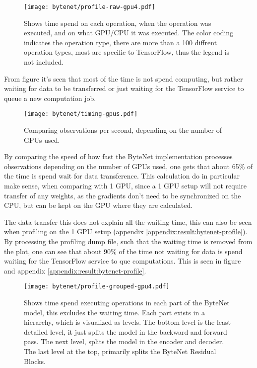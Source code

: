 \begin{figure}[h]
    \centering
    \texttt{[image: bytenet/profile-raw-gpu4.pdf]}
    \caption{Shows time spend on each operation, when the operation was executed, and on what GPU/CPU it was executed. The color coding indicates the operation type, there are more than a 100 diffrent operation types, most are specific to TensorFlow, thus the legend is not included.}
    \label{fig:result:bytenet:profile-raw}
\end{figure}

From figure \label{fig:result:bytenet:profile-raw} it's seen that most of the time is not spend computing, but rather waiting for data to be transferred or just waiting for the TensorFlow service to queue a new computation job.

\begin{figure}[h]
    \centering
    \texttt{[image: bytenet/timing-gpus.pdf]}
    \caption{Comparing observations per second, depending on the number of GPUs used.}
    \label{fig:result:bytenet:timing-gpus}
\end{figure}

By comparing the speed of how fast the ByteNet implementation processes observations depending on the number of GPUs used, one gets that about 65\% of the time is spend wait for data transference. This calculation do in particular make sense, when comparing with 1 GPU, since a 1 GPU setup will not require transfer of any weights, as the gradients don't need to be synchronized on the CPU, but can be kept on the GPU where they are calculated.

The data transfer this does not explain all the waiting time, this can also be seen when profiling on the 1 GPU setup (appendix \ref{appendix:result:bytenet-profile}). By processing the profiling dump file, such that the waiting time is removed from the plot, one can see that about 90\% of the time not waiting for data is spend waiting for the TensorFlow service to que computations. This is seen in figure \label{fig:result:bytenet:profile-raw} and appendix \ref{appendix:result:bytenet-profile}.

\begin{figure}[h]
    \centering
    \texttt{[image: bytenet/profile-grouped-gpu4.pdf]}
    \caption{Shows time spend executing operations in each part of the ByteNet model, this excludes the waiting time. Each part exists in a hierarchy, which is visualized as levels. The bottom level is the least detailed level, it just splits the model in the backward and forward pass. The next level, splits the model in the encoder and decoder. The last level at the top, primarily splits the ByteNet Residual Blocks.}
    \label{fig:result:bytenet:profile-raw}
\end{figure}

